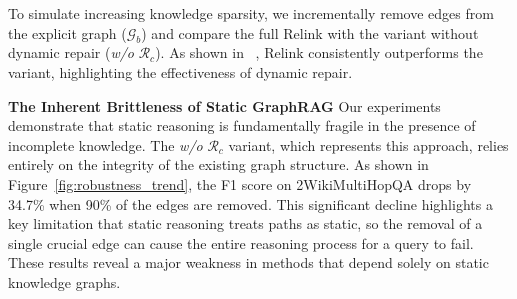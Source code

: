 \documentclass[letterpaper]{article} %
\begin{document}








To simulate increasing knowledge sparsity, we incrementally remove edges from the explicit graph ($\mathcal{G}_b$) and compare the full Relink with the variant without dynamic repair (\textit{w/o} $\mathcal{R}_c$). As shown in ~, Relink consistently outperforms the variant, highlighting the effectiveness of dynamic repair.


\noindent\textbf{The Inherent Brittleness of Static GraphRAG}
Our experiments demonstrate that static reasoning is fundamentally fragile in the presence of incomplete knowledge. The \textit{w/o} $\mathcal{R}_c$ variant, which represents this approach, relies entirely on the integrity of the existing graph structure. As shown in Figure~\ref{fig:robustness_trend}, the F1 score on 2WikiMultiHopQA drops by 34.7\% when 90\% of the edges are removed. This significant decline highlights a key limitation that static reasoning treats paths as static, so the removal of a single crucial edge can cause the entire reasoning process for a query to fail. These results reveal a major weakness in methods that depend solely on static knowledge graphs.
\end{document}
